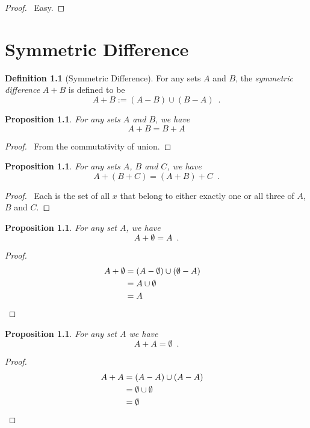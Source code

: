 \documentclass{report}
\let\qed\relax
\newtheorem{prop}[ax]{Proposition}
\theoremstyle{definition}
\newtheorem{df}[ax]{Definition}
\begin{document}
\begin{proof}
\pf\ Easy. \qed
\end{proof}

\chapter{Symmetric Difference}

\begin{df}[Symmetric Difference]
For any sets $A$ and $B$, the \emph{symmetric difference} $A + B$ is defined to be
\[ A + B := (A - B) \cup (B - A) \enspace . \]
\end{df}

\begin{prop}
For any sets $A$ and $B$, we have
\[ A + B = B + A \]
\end{prop}

\begin{proof}
\pf\ From the commutativity of union. \qed
\end{proof}

\begin{prop}
For any sets $A$, $B$ and $C$, we have
\[ A + (B + C) = (A + B) + C \enspace . \]
\end{prop}

\begin{proof}
\pf\ Each is the set of all $x$ that belong to either exactly one or all three of $A$, $B$ and $C$. \qed
\end{proof}

\begin{prop}
For any set $A$, we have
\[ A + \emptyset = A \enspace . \]
\end{prop}

\begin{proof}
\pf
\begin{align*}
A + \emptyset & = (A - \emptyset) \cup (\emptyset - A) \\
& = A \cup \emptyset \\
& = A & \qed
\end{align*}
\end{proof}

\begin{prop}
For any set $A$ we have
\[ A + A = \emptyset \enspace . \]
\end{prop}

\begin{proof}
\pf
\begin{align*}
A + A & = (A - A) \cup (A - A) \\
& = \emptyset \cup \emptyset \\
& = \emptyset & \qed
\end{align*}
\end{proof}
\end{document}
